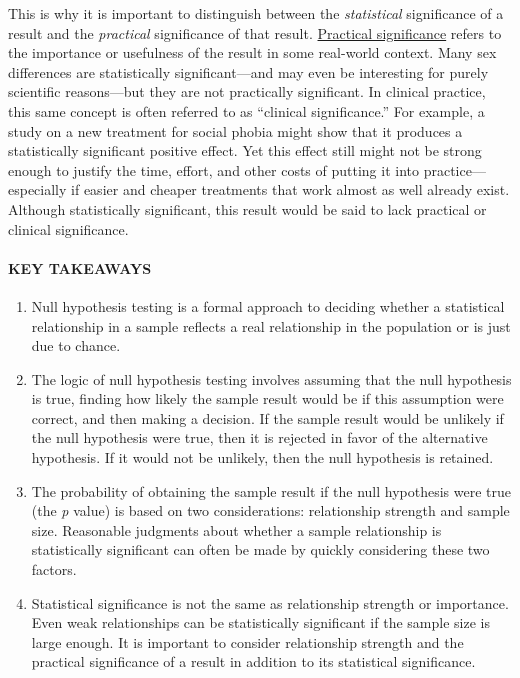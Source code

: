\documentclass[
]{krantz}
\providecommand{\tightlist}{%
  \setlength{\itemsep}{0pt}\setlength{\parskip}{0pt}}
\begin{document}
This is why it is important to distinguish between the \emph{statistical} significance of a result and the \emph{practical} significance of that result. \protect\hyperlink{practical-significance}{Practical significance} refers to the importance or usefulness of the result in some real-world context. Many sex differences are statistically significant---and may even be interesting for purely scientific reasons---but they are not practically significant. In clinical practice, this same concept is often referred to as ``clinical significance.'' For example, a study on a new treatment for social phobia might show that it produces a statistically significant positive effect. Yet this effect still might not be strong enough to justify the time, effort, and other costs of putting it into practice---especially if easier and cheaper treatments that work almost as well already exist. Although statistically significant, this result would be said to lack practical or clinical significance.

\hypertarget{key-takeaways-38}{%
\paragraph*{KEY TAKEAWAYS}\label{key-takeaways-38}}

\begin{enumerate}
\def\labelenumi{\arabic{enumi}.}
\tightlist
\item
  Null hypothesis testing is a formal approach to deciding whether a statistical relationship in a sample reflects a real relationship in the population or is just due to chance.
\item
  The logic of null hypothesis testing involves assuming that the null hypothesis is true, finding how likely the sample result would be if this assumption were correct, and then making a decision. If the sample result would be unlikely if the null hypothesis were true, then it is rejected in favor of the alternative hypothesis. If it would not be unlikely, then the null hypothesis is retained.
\item
  The probability of obtaining the sample result if the null hypothesis were true (the \emph{p} value) is based on two considerations: relationship strength and sample size. Reasonable judgments about whether a sample relationship is statistically significant can often be made by quickly considering these two factors.
\item
  Statistical significance is not the same as relationship strength or importance. Even weak relationships can be statistically significant if the sample size is large enough. It is important to consider relationship strength and the practical significance of a result in addition to its statistical significance.
\end{enumerate}
\end{document}
